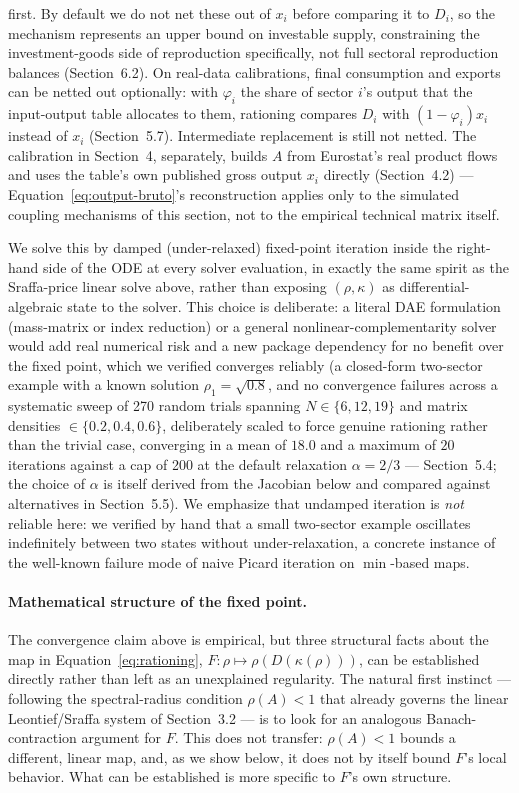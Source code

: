 \documentclass[11pt]{article}
\begin{document}
first. By default we do not net these out of $x_i$ before comparing it to
$D_i$, so the mechanism represents an upper bound on investable supply,
constraining the investment-goods side of reproduction specifically, not
full sectoral reproduction balances (Section~6.2). On real-data
calibrations, final consumption and exports can be netted out
optionally: with $\varphi_i$ the share of sector $i$'s output that the
input-output table allocates to them, rationing compares $D_i$ with
$(1-\varphi_i)x_i$ instead of $x_i$ (Section~5.7). Intermediate
replacement is still not netted. The calibration in
Section~4, separately, builds $A$
from Eurostat's real product flows and uses the table's own published
gross output $x_i$ directly (Section~4.2) --- Equation~\eqref{eq:output-bruto}'s
reconstruction applies only to the simulated coupling mechanisms
of this section, not to the empirical technical matrix itself.

We solve this by damped (under-relaxed) fixed-point iteration inside the
right-hand side of the ODE at every solver evaluation, in exactly the same
spirit as the Sraffa-price linear solve above, rather than exposing
$(\rho,\kappa)$ as differential-algebraic state to the solver. This choice
is deliberate: a literal DAE formulation (mass-matrix or index reduction)
or a general nonlinear-complementarity solver would add real numerical
risk and a new package dependency for no benefit over the fixed point,
which we verified converges reliably (a closed-form two-sector example
with a known solution $\rho_1=\sqrt{0.8}$, and no convergence failures
across a systematic sweep of 270 random trials spanning $N\in\{6,12,19\}$
and matrix densities $\in\{0.2,0.4,0.6\}$, deliberately scaled to force
genuine rationing rather than the trivial case, converging in a mean of
$18.0$ and a maximum of $20$ iterations against a cap of 200 at the
default relaxation $\alpha=2/3$ --- Section~5.4; the choice of $\alpha$
is itself derived from the Jacobian below and compared against
alternatives in Section~5.5).
We emphasize that undamped iteration is \emph{not} reliable here: we
verified by hand that a small two-sector example oscillates indefinitely
between two states without under-relaxation, a concrete instance of the
well-known failure mode of naive Picard iteration on $\min$-based maps.

\paragraph{Mathematical structure of the fixed point.} The convergence
claim above is empirical, but three structural facts about the map in
Equation~\eqref{eq:rationing}, $F:\rho\mapsto\rho(D(\kappa(\rho)))$, can be
established directly rather than left as an unexplained regularity. The
natural first instinct --- following the spectral-radius condition
$\rho(A)<1$ that already governs the linear Leontief/Sraffa system of
Section~3.2 --- is to look for an analogous Banach-contraction argument
for $F$. This does not transfer: $\rho(A)<1$ bounds a different, linear
map, and, as we show below, it does not by itself bound $F$'s local
behavior. What can be established is more specific to $F$'s own
structure.
\end{document}
